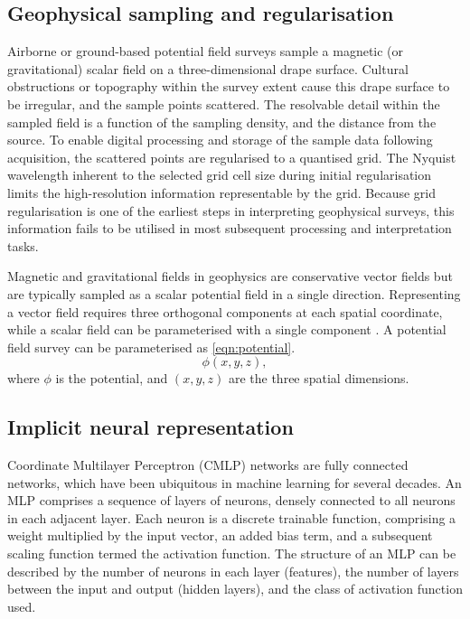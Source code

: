 \documentclass[manuscript.tex]{subfiles}
\begin{document}
\subsection{Geophysical sampling and regularisation}
\label{sec:geo_airborne}
Airborne or ground-based potential field surveys sample a magnetic (or gravitational) scalar field on a three-dimensional drape surface.
Cultural obstructions or topography within the survey extent cause this drape surface to be irregular, and the sample points scattered.
The resolvable detail within the sampled field is a function of the sampling density, and the distance from the source.
To enable digital processing and storage of the sample data following acquisition, the scattered points are regularised to a quantised grid.
The Nyquist wavelength inherent to the selected grid cell size during initial regularisation limits the high-resolution information representable by the grid.
Because grid regularisation is one of the earliest steps in interpreting geophysical surveys, this information fails to be utilised in most subsequent processing and interpretation tasks.

\label{sec:geo_physics}
Magnetic and gravitational fields in geophysics are conservative vector fields but are typically sampled as a scalar potential field in a single direction.
Representing a vector field requires three orthogonal components at each spatial coordinate, while a scalar field can be parameterised with a single component \parencite{blakelyPotentialTheoryGravity1996}.
A potential field survey can be parameterised as \cref{eqn:potential}.
\begin{equation}
    \label{eqn:potential}
    \phi\left(x,y,z\right),
\end{equation}
where \(\phi{}\) is the potential, and \({(x,y,z)}\) are the three spatial dimensions.

\subsection{Implicit neural representation}
\label{sec:inr}
Coordinate Multilayer Perceptron (CMLP) networks are fully connected networks, which have been ubiquitous in machine learning for several decades.
An MLP comprises a sequence of layers of neurons, densely connected to all neurons in each adjacent layer.
Each neuron is a discrete trainable function, comprising a weight multiplied by the input vector, an added bias term, and a subsequent scaling function termed the activation function.
The structure of an MLP can be described by the number of neurons in each layer (features), the number of layers between the input and output (hidden layers), and the class of activation function used.
\end{document}
